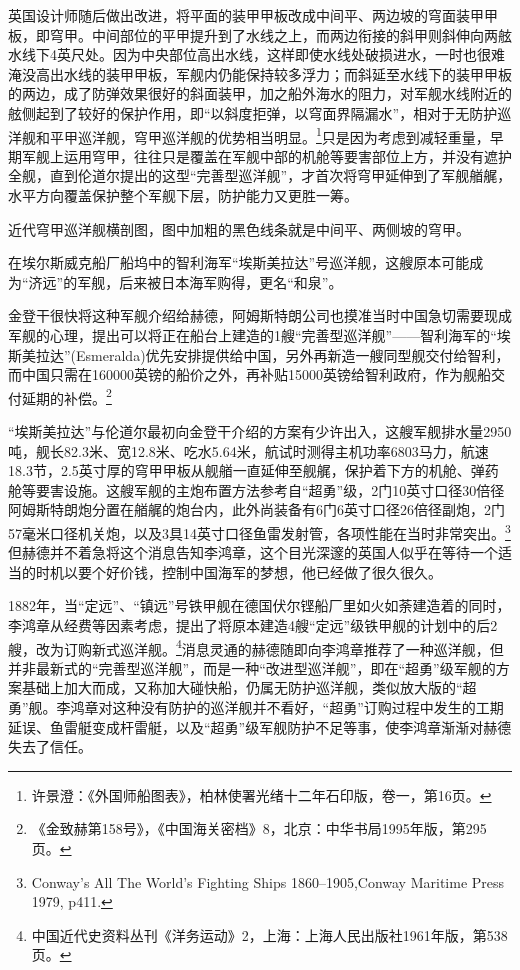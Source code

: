 \documentclass[12pt,UTF8]{ctexbook}
\begin{document}
英国设计师随后做出改进，将平面的装甲甲板改成中间平、两边坡的穹面装甲甲板，即穹甲。中间部位的平甲提升到了水线之上，而两边衔接的斜甲则斜伸向两舷水线下4英尺处。因为中央部位高出水线，这样即使水线处破损进水，一时也很难淹没高出水线的装甲甲板，军舰内仍能保持较多浮力；而斜延至水线下的装甲甲板的两边，成了防弹效果很好的斜面装甲，加之船外海水的阻力，对军舰水线附近的舷侧起到了较好的保护作用，即“以斜度拒弹，以穹面界隔漏水”，相对于无防护巡洋舰和平甲巡洋舰，穹甲巡洋舰的优势相当明显。\footnote{许景澄：《外国师船图表》，柏林使署光绪十二年石印版，卷一，第16页。}只是因为考虑到减轻重量，早期军舰上运用穹甲，往往只是覆盖在军舰中部的机舱等要害部位上方，并没有遮护全舰，直到伦道尔提出的这型“完善型巡洋舰”，才首次将穹甲延伸到了军舰艏艉，水平方向覆盖保护整个军舰下层，防护能力又更胜一筹。

近代穹甲巡洋舰横剖图，图中加粗的黑色线条就是中间平、两侧坡的穹甲。

在埃尔斯威克船厂船坞中的智利海军“埃斯美拉达”号巡洋舰，这艘原本可能成为“济远”的军舰，后来被日本海军购得，更名“和泉”。

金登干很快将这种军舰介绍给赫德，阿姆斯特朗公司也摸准当时中国急切需要现成军舰的心理，提出可以将正在船台上建造的1艘“完善型巡洋舰”——智利海军的“埃斯美拉达”(Esmeralda)优先安排提供给中国，另外再新造一艘同型舰交付给智利，而中国只需在160000英镑的船价之外，再补贴15000英镑给智利政府，作为舰船交付延期的补偿。\footnote{《金致赫第158号》，《中国海关密档》8，北京：中华书局1995年版，第295页。}

“埃斯美拉达”与伦道尔最初向金登干介绍的方案有少许出入，这艘军舰排水量2950吨，舰长82.3米、宽12.8米、吃水5.64米，航试时测得主机功率6803马力，航速18.3节，2.5英寸厚的穹甲甲板从舰艏一直延伸至舰艉，保护着下方的机舱、弹药舱等要害设施。这艘军舰的主炮布置方法参考自“超勇”级，2门10英寸口径30倍径阿姆斯特朗炮分置在艏艉的炮台内，此外尚装备有6门6英寸口径26倍径副炮，2门57毫米口径机关炮，以及3具14英寸口径鱼雷发射管，各项性能在当时非常突出。\footnote{Conway's All The World's Fighting Ships 1860--1905,Conway Maritime Press 1979, p411.}但赫德并不着急将这个消息告知李鸿章，这个目光深邃的英国人似乎在等待一个适当的时机以要个好价钱，控制中国海军的梦想，他已经做了很久很久。

1882年，当“定远”、“镇远”号铁甲舰在德国伏尔铿船厂里如火如荼建造着的同时，李鸿章从经费等因素考虑，提出了将原本建造4艘“定远”级铁甲舰的计划中的后2艘，改为订购新式巡洋舰。\footnote{中国近代史资料丛刊《洋务运动》2，上海：上海人民出版社1961年版，第538页。}消息灵通的赫德随即向李鸿章推荐了一种巡洋舰，但并非最新式的“完善型巡洋舰”，而是一种“改进型巡洋舰”，即在“超勇”级军舰的方案基础上加大而成，又称加大碰快船，仍属无防护巡洋舰，类似放大版的“超勇”舰。李鸿章对这种没有防护的巡洋舰并不看好，“超勇”订购过程中发生的工期延误、鱼雷艇变成杆雷艇，以及“超勇”级军舰防护不足等事，使李鸿章渐渐对赫德失去了信任。
\end{document}
